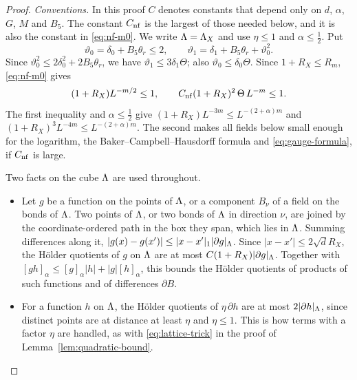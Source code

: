 \begin{proof}
\emph{Conventions.} In this proof $C$ denotes constants that depend only on $d$, $\alpha$, $G$, $M$ and $B_5$. The constant $C_{\rm nf}$ is the largest of those needed below, and it is also the constant in \eqref{eq:nf-m0}. We write $\Lambda=\Lambda_X$ and use $\eta\le1$ and $\alpha\le\frac12$. Put
\[
\vartheta_0=\delta_0+B_5\theta_r\le2,\qquad\vartheta_1=\delta_1+B_5\theta_r+\vartheta_0^2 .
\]
Since $\vartheta_0^2\le2\delta_0^2+2B_5\theta_r$, we have $\vartheta_1\le3\delta_1\Theta$; also $\vartheta_0\le\delta_0\Theta$. Since $1+R_X\le R_m$, \eqref{eq:nf-m0} gives
\begin{equation}\label{eq:nf-small}
(1+R_X)L^{-m/2}\le1,\qquad C_{\rm nf}(1+R_X)^2\,\Theta\,L^{-m}\le1 .
\end{equation}
The first inequality and $\alpha\le\frac12$ give $(1+R_X)L^{-3m}\le L^{-(2+\alpha)m}$ and $(1+R_X)^3L^{-4m}\le L^{-(2+\alpha)m}$. The second makes all fields below small enough for the logarithm, the Baker--Campbell--Hausdorff formula and \eqref{eq:gauge-formula}, if $C_{\rm nf}$ is large.

Two facts on the cube $\Lambda$ are used throughout.
\begin{itemize}
\item[(H1)] Let $g$ be a function on the points of $\Lambda$, or a component $B_\nu$ of a field on the bonds of $\Lambda$. Two points of $\Lambda$, or two bonds of $\Lambda$ in direction $\nu$, are joined by the coordinate-ordered path in the box they span, which lies in $\Lambda$. Summing differences along it, $|g(x)-g(x')|\le|x-x'|_1|\partial g|_\Lambda$. Since $|x-x'|\le2\sqrt dR_X$, the H\"older quotients of $g$ on $\Lambda$ are at most $C(1+R_X)|\partial g|_\Lambda$. Together with $[gh]_\alpha\le[g]_\alpha|h|+|g|[h]_\alpha$, this bounds the H\"older quotients of products of such functions and of differences $\partial B$.
\item[(H2)] For a function $h$ on $\Lambda$, the H\"older quotients of $\eta\,\partial h$ are at most $2|\partial h|_\Lambda$, since distinct points are at distance at least $\eta$ and $\eta\le1$. This is how terms with a factor $\eta$ are handled, as with \eqref{eq:lattice-trick} in the proof of Lemma~\ref{lem:quadratic-bound}.
\end{itemize}


\end{proof}
